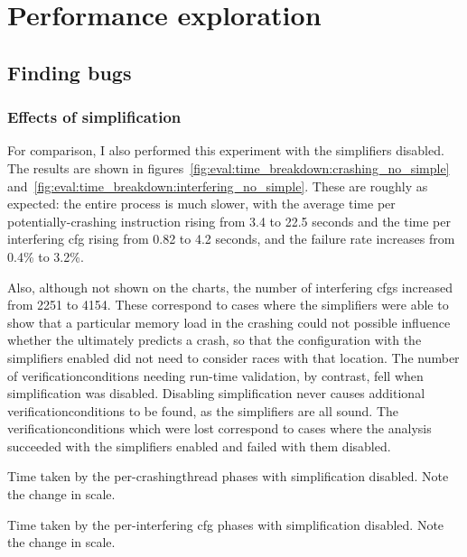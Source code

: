 \section{Performance exploration}
\label{sect:eval:time_details}

\subsection{Finding bugs}

\subsubsection{Effects of {\StateMachine} simplification}

For comparison, I also performed this experiment with the
{\StateMachine} simplifiers disabled.  The results are shown in
figures~\ref{fig:eval:time_breakdown:crashing_no_simple}
and~\ref{fig:eval:time_breakdown:interfering_no_simple}.  These are
roughly as expected: the entire process is much slower, with the
average time per potentially-crashing instruction rising from 3.4 to
22.5 seconds and the time per interfering \gls{cfg} rising from 0.82
to 4.2 seconds, and the failure rate increases from 0.4\% to 3.2\%.

Also, although not shown on the charts, the number of interfering
\glspl{cfg} increased from 2251 to 4154.  These correspond to cases
where the simplifiers were able to show that a particular memory load
in the crashing {\StateMachine} could not possible influence whether
the {\StateMachine} ultimately predicts a crash, so that the
configuration with the simplifiers enabled did not need to consider
races with that location.  The number of \glspl{verificationcondition}
needing run-time validation, by contrast, fell when simplification was
disabled.  Disabling simplification never causes additional
\glspl{verificationcondition} to be found, as the simplifiers are all
sound.  The \glspl{verificationcondition} which were lost correspond
to cases where the analysis succeeded with the simplifiers enabled and
failed with them disabled.

\begin{sanefig}
  \caption{Time taken by the per-\gls{crashingthread} phases with
    {\StateMachine} simplification disabled.  Note the change in
    scale.}
  \label{fig:eval:time_breakdown:crashing_no_simple}
\end{sanefig}

\begin{sanefig}
  \caption{Time taken by the per-interfering \gls{cfg} phases with
    {\StateMachine} simplification disabled.  Note the change in
    scale.}
  \label{fig:eval:time_breakdown:interfering_no_simple}
\end{sanefig}

